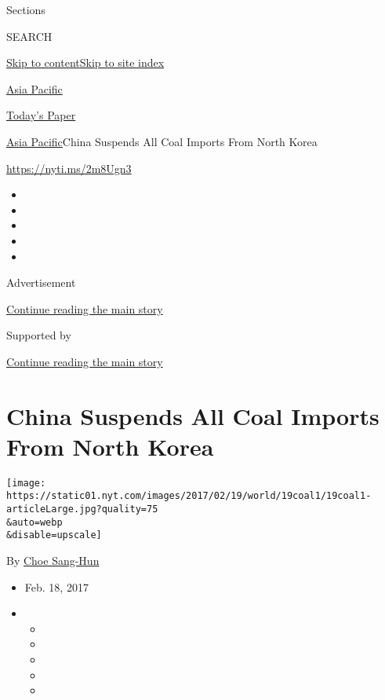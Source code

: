 Sections

SEARCH

\protect\hyperlink{site-content}{Skip to
content}\protect\hyperlink{site-index}{Skip to site index}

\href{https://www.nytimes.com/section/world/asia}{Asia Pacific}

\href{https://myaccount.nytimes.com/auth/login?response_type=cookie\&client_id=vi}{}

\href{https://www.nytimes.com/section/todayspaper}{Today's Paper}

\href{/section/world/asia}{Asia Pacific}\textbar{}China Suspends All
Coal Imports From North Korea

\url{https://nyti.ms/2m8Ugn3}

\begin{itemize}
\item
\item
\item
\item
\item
\end{itemize}

Advertisement

\protect\hyperlink{after-top}{Continue reading the main story}

Supported by

\protect\hyperlink{after-sponsor}{Continue reading the main story}

\hypertarget{china-suspends-all-coal-imports-from-north-korea}{%
\section{China Suspends All Coal Imports From North
Korea}\label{china-suspends-all-coal-imports-from-north-korea}}

\texttt{[image: https://static01.nyt.com/images/2017/02/19/world/19coal1/19coal1-articleLarge.jpg?quality=75\\\&auto=webp\\\&disable=upscale]}

By \href{http://www.nytimes.com/by/choe-sang-hun}{Choe Sang-Hun}

\begin{itemize}
\item
  Feb. 18, 2017
\item
  \begin{itemize}
  \item
  \item
  \item
  \item
  \item
  \end{itemize}
\end{itemize}

